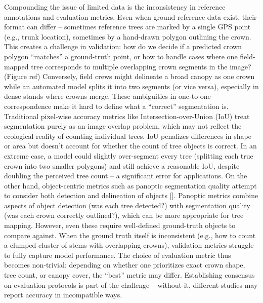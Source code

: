 \documentclass[runningheads]{llncs}
\begin{document}
Compounding the issue of limited data is the inconsistency in reference
annotations and evaluation metrics. Even when ground-reference data
exist, their format can differ -- sometimes reference trees are marked
by a single GPS point (e.g., trunk location), sometimes by a hand-drawn
polygon outlining the crown. This creates a challenge in validation: how
do we decide if a predicted crown polygon ``matches'' a ground-truth
point, or how to handle cases where one field-mapped tree corresponds to
multiple overlapping crown segments in the image?(Figure ref)
Conversely, field crews might delineate a broad canopy as one crown
while an automated model splits it into two segments (or vice versa),
especially in dense stands where crowns merge. These ambiguities in
one-to-one correspondence make it hard to define what a ``correct''
segmentation is. Traditional pixel-wise accuracy metrics like
Intersection-over-Union (IoU) treat segmentation purely as an image
overlap problem, which may not reflect the ecological reality of
counting individual trees. IoU penalizes differences in shape or area
but doesn't account for whether the count of tree objects is correct. In
an extreme case, a model could slightly over-segment every tree
(splitting each true crown into two smaller polygons) and still achieve
a reasonable IoU, despite doubling the perceived tree count -- a
significant error for applications. On the other hand, object-centric
metrics such as panoptic segmentation quality attempt to consider both
detection and delineation of objects
{[}\cite{kirillov2019panopticsegmentation}{]}. Panoptic metrics combine
aspects of object detection (was each tree detected?) with segmentation
quality (was each crown correctly outlined?), which can be more
appropriate for tree mapping. However, even these require well-defined
ground-truth objects to compare against. When the ground truth itself is
inconsistent (e.g., how to count a clumped cluster of stems with
overlapping crowns), validation metrics struggle to fully capture model
performance. The choice of evaluation metric thus becomes non-trivial:
depending on whether one prioritizes exact crown shape, tree count, or
canopy cover, the ``best'' metric may differ. Establishing consensus on
evaluation protocols is part of the challenge -- without it, different
studies may report accuracy in incompatible ways.
\end{document}
